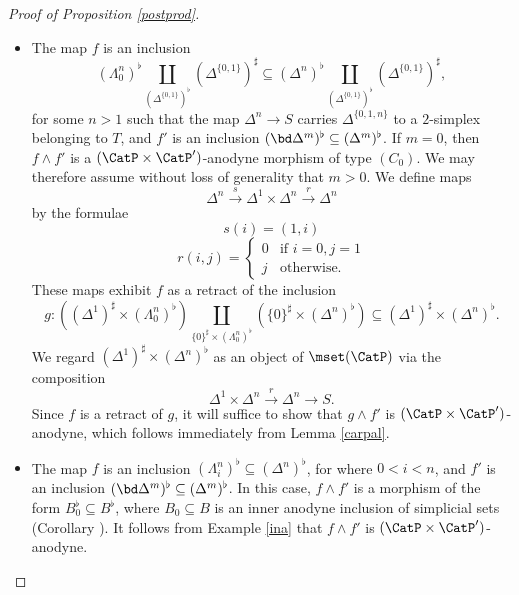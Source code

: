 \begin{proof}[Proof of Proposition \ref{postprod}]
\begin{itemize}
\item[$(C'_0)$] The map $f$ is an inclusion
$$ (\Lambda^n_0)^{\flat} \coprod_{ (\Delta^{ \{0,1\} })^{\flat} } ( \Delta^{ \{0,1\} })^{\sharp}
\subseteq ( \Delta^n )^{\flat} \coprod_{ ( \Delta^{ \{0,1\} })^{\flat} } ( \Delta^{ \{0,1\} })^{\sharp},$$
for some $n > 1$ such that the map $\Delta^n \rightarrow S$ carries 
$\Delta^{ \{0, 1, n\} }$ to a $2$-simplex belonging to $T$, and 
$f'$ is an inclusion $( \bd \Delta^m)^{\flat} \subseteq (\Delta^m)^{\flat}$.
If $m = 0$, then $f \wedge f'$ is a $(\CatP \times \CatP')$-anodyne morphism of
type $(C_0)$. We may therefore assume without loss of generality that $m > 0$.
We define maps
$$ \Delta^n \stackrel{s}{\rightarrow} \Delta^{1} \times \Delta^{n} \stackrel{r}{\rightarrow} \Delta^n$$
by the formulae
$$ s(i) = (1,i)$$
$$ r(i,j) = \begin{cases} 0 & \text{if } i=0, j=1 \\
j & \text{otherwise.} \end{cases}$$
These maps exhibit $f$ as a retract of the inclusion
$$g: ((\Delta^1)^{\sharp} \times (\Lambda^n_0)^{\flat}) \coprod_{ \{0\}^{\sharp} \times (\Lambda^n_0)^{\flat} } ( \{0\}^{\sharp} \times (\Delta^n)^{\flat} ) \subseteq (\Delta^1)^{\sharp} \times (\Delta^n)^{\flat}.$$
We regard $(\Delta^{1})^{\sharp} \times (\Delta^n)^{\flat}$ as an object of $\mset( \CatP )$
via the composition
$$ \Delta^1 \times \Delta^{n} \stackrel{r}{\rightarrow} \Delta^{n} \rightarrow S.$$
Since $f$ is a retract of $g$, it will suffice to show that $g \wedge f'$ is $(\CatP \times \CatP')$-anodyne, which follows
immediately from Lemma \ref{carpal}.

\item[$(C'_1)$] The map $f$ is an inclusion $(\Lambda^{n}_i)^{\flat} \subseteq (\Delta^n)^{\flat}$, for 
where $0 < i < n$, and $f'$ is an inclusion $(\bd \Delta^m)^{\flat} \subseteq (\Delta^m)^{\flat}$.
In this case, $f \wedge f'$ is a morphism of the form $B_0^{\flat} \subseteq B^{\flat}$, where
$B_0 \subseteq B$ is an inner anodyne inclusion of simplicial sets (Corollary ).
It follows from Example \ref{ina} that $f \wedge f'$ is $(\CatP \times \CatP')$-anodyne.


\end{itemize}
\end{proof}

